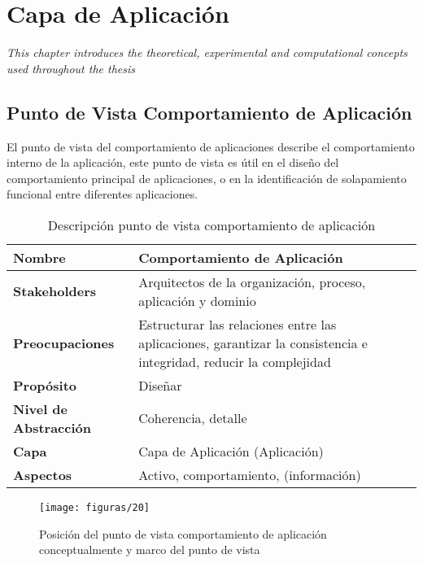 \chapter{Capa de Aplicación}
\label{chap:Aplicacion}
\textit{This chapter introduces the theoretical, experimental and computational concepts used throughout the thesis}
\vspace{2ex}\vfill
\minitoc
\newpage

\section{Punto de Vista Comportamiento de Aplicación}
El punto de vista del comportamiento de aplicaciones describe el comportamiento interno de la aplicación, este punto de vista es útil en el diseño del comportamiento principal de aplicaciones, o en la identificación de solapamiento funcional entre diferentes aplicaciones.

  \begin{table}[H]
  	\centering
  	\begin{tabular}{lp{8cm}}
  		\toprule
  		\textbf{Nombre} & \textbf{Comportamiento de Aplicación} \\
  		\midrule
  		\textbf{Stakeholders} & Arquitectos de la organización, proceso, aplicación y dominio \\
  		\textbf{Preocupaciones} & Estructurar las relaciones entre las aplicaciones, garantizar la consistencia e integridad, reducir la complejidad \\
  		\textbf{Propósito} & Diseñar \\
  		\textbf{Nivel de Abstracción} & Coherencia, detalle \\
  		\textbf{Capa} & Capa de Aplicación (Aplicación) \\
  		\textbf{Aspectos} & Activo, comportamiento, (información) \\
  		\bottomrule
  	\end{tabular}
	\captionsetup{width=.95\textwidth}
	\caption{Descripción punto de vista comportamiento de aplicación}
	\label{tabla10}
  \end{table}

  \begin{figure}[H]
	\centering
	\texttt{[image: figuras/20]}
	\captionsetup{width=.95\textwidth}
	\caption{Posición del punto de vista comportamiento de aplicación conceptualmente y marco del punto de vista}
	\label{figura20}
  \end{figure}

